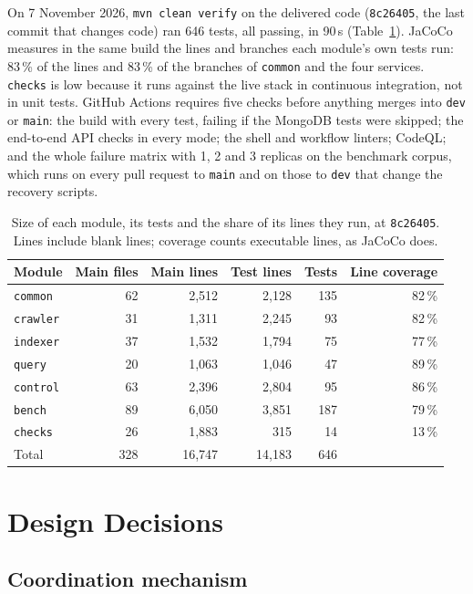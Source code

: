 \documentclass[11pt,a4paper]{article}
\newcommand{\code}[1]{\nolinkurl{#1}}
\begin{document}
On 7 November 2026, \texttt{mvn clean verify} on the delivered code (\code{8c26405}, the last commit that changes code)
ran 646 tests, all passing, in 90\,s (Table~\ref{tab:tests}). JaCoCo measures in the same build the lines and branches
each module's own tests run: 83\,\% of the lines and 83\,\% of the branches of \code{common} and the four services.
\code{checks} is low because it runs against the live stack in continuous integration, not in unit tests. GitHub Actions requires five checks before anything merges into \code{dev} or \code{main}:
the build with every test, failing if the MongoDB tests were skipped; the end-to-end API checks in every mode; the shell
and workflow linters; CodeQL; and the whole failure matrix with 1, 2 and 3 replicas on the benchmark corpus, which runs
on every pull request to \code{main} and on those to \code{dev} that change the recovery scripts.

\begin{table}[ht]
\centering
\small
\caption{Size of each module, its tests and the share of its lines they run, at \code{8c26405}. Lines include blank
lines; coverage counts executable lines, as JaCoCo does.}
\label{tab:tests}
\begin{tabular}{@{}lrrrrr@{}}
\toprule
Module & Main files & Main lines & Test lines & Tests & Line coverage \\
\midrule
\code{common} & 62 & 2{,}512 & 2{,}128 & 135 & 82\,\% \\
\code{crawler} & 31 & 1{,}311 & 2{,}245 & 93 & 82\,\% \\
\code{indexer} & 37 & 1{,}532 & 1{,}794 & 75 & 77\,\% \\
\code{query} & 20 & 1{,}063 & 1{,}046 & 47 & 89\,\% \\
\code{control} & 63 & 2{,}396 & 2{,}804 & 95 & 86\,\% \\
\code{bench} & 89 & 6{,}050 & 3{,}851 & 187 & 79\,\% \\
\code{checks} & 26 & 1{,}883 & 315 & 14 & 13\,\% \\
\midrule
Total & 328 & 16{,}747 & 14{,}183 & 646 & \\
\bottomrule
\end{tabular}
\end{table}
\section{Design Decisions}
\label{sec:decisions}

\subsection{Coordination mechanism}
\end{document}
